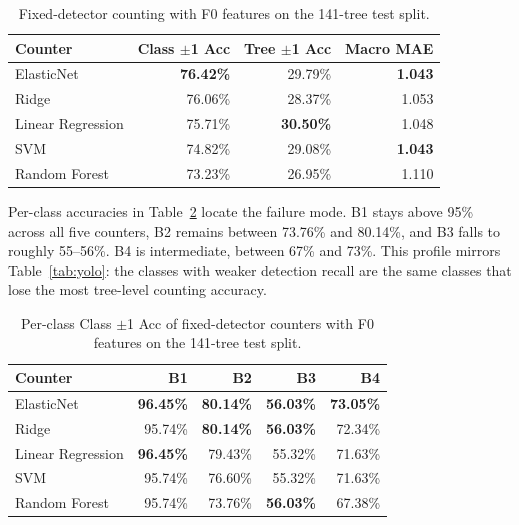 \documentclass[conference]{IEEEtran}
\begin{document}
\begin{table}[!htbp]
  \centering
  \footnotesize
  \setlength{\tabcolsep}{3pt}
  \caption{Fixed-detector counting with F0 features on the 141-tree test split.}
  \label{tab:fixed}
  \begin{tabular}{@{}lrrr@{}}
    \toprule
    Counter           & Class $\pm$1 Acc & Tree $\pm$1 Acc  & Macro MAE      \\
    \midrule
    ElasticNet        & \textbf{76.42\%} & 29.79\%          & \textbf{1.043} \\
    Ridge             & 76.06\%          & 28.37\%          & 1.053          \\
    Linear Regression & 75.71\%          & \textbf{30.50\%} & 1.048          \\
    SVM               & 74.82\%          & 29.08\%          & \textbf{1.043} \\
    Random Forest     & 73.23\%          & 26.95\%          & 1.110          \\
    \bottomrule
  \end{tabular}
\end{table}

Per-class accuracies in Table~\ref{tab:perclass} locate the failure mode. B1
stays above 95\% across all five counters, B2 remains between 73.76\% and
80.14\%, and B3 falls to roughly 55--56\%. B4 is intermediate, between 67\% and
73\%. This profile mirrors Table~\ref{tab:yolo}: the classes with weaker
detection recall are the same classes that lose the most tree-level counting
accuracy.

\begin{table}[!htbp]
  \centering
  \scriptsize
  \setlength{\tabcolsep}{3pt}
  \caption{Per-class Class $\pm$1 Acc of fixed-detector counters with F0
    features on the 141-tree test split.}
  \label{tab:perclass}
  \begin{tabular}{@{}lrrrr@{}}
    \toprule
    Counter           & B1               & B2               & B3               & B4               \\
    \midrule
    ElasticNet        & \textbf{96.45\%} & \textbf{80.14\%} & \textbf{56.03\%} & \textbf{73.05\%} \\
    Ridge             & 95.74\%          & \textbf{80.14\%} & \textbf{56.03\%} & 72.34\%          \\
    Linear Regression & \textbf{96.45\%} & 79.43\%          & 55.32\%          & 71.63\%          \\
    SVM               & 95.74\%          & 76.60\%          & 55.32\%          & 71.63\%          \\
    Random Forest     & 95.74\%          & 73.76\%          & \textbf{56.03\%} & 67.38\%          \\
    \bottomrule
  \end{tabular}
\end{table}
\end{document}
